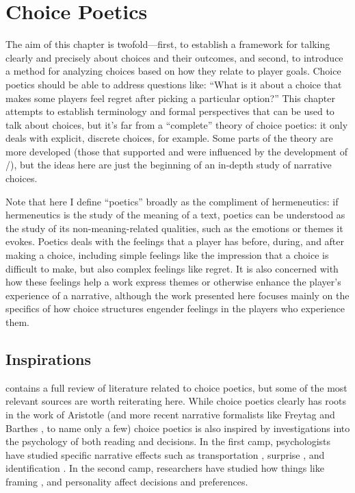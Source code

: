 \chapter{Choice Poetics}

\label{ch:choice-poetics}

The aim of this chapter is twofold---first, to establish a framework for talking clearly and precisely about choices and their outcomes, and second, to introduce a method for analyzing choices based on how they relate to player goals.
%
Choice poetics should be able to address questions like: ``What is it about a choice that makes some players feel regret after picking a particular option?''
%
This chapter attempts to establish terminology and formal perspectives that can be used to talk about choices, but it's far from a ``complete'' theory of choice poetics: it only deals with explicit, discrete choices, for example.
%
Some parts of the theory are more developed (those that supported and were influenced by the development of \dunyazad/), but the ideas here are just the beginning of an in-depth study of narrative choices.


Note that here I define ``poetics'' broadly as the compliment of hermeneutics: if hermeneutics is the study of the meaning of a text, poetics can be understood as the study of its non-meaning-related qualities, such as the emotions or themes it evokes.
%
Poetics deals with the feelings that a player has before, during, and after making a choice, including simple feelings like the impression that a choice is difficult to make, but also complex feelings like regret.
%
It is also concerned with how these feelings help a work express themes or otherwise enhance the player's experience of a narrative, although the work presented here focuses mainly on the specifics of how choice structures engender feelings in the players who experience them.


\section{Inspirations}

 contains a full review of literature related to choice poetics, but some of the most relevant sources are worth reiterating here.
%
While choice poetics clearly has roots in the work of Aristotle \citep{Aristotle1917} (and more recent narrative formalists like Freytag \citep{Freytag1894} and Barthes \citep{Barthes1975}, to name only a few) choice poetics is also inspired by investigations into the psychology of both reading and decisions.
%
In the first camp, psychologists have studied specific narrative effects such as transportation \citep{Green2000}, surprise \citep{Iran-Nejad1987}, and identification \citep{Oatley1995}.
%
In the second camp, researchers have studied how things like framing \citep{Tversky1981,Tversky1993}, and personality \citep{Schwartz2002} affect decisions and preferences.


